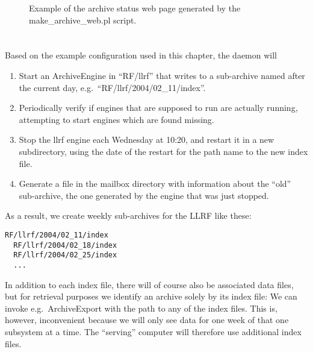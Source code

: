 \begin{figure}[htb]
\begin{center}
\end{center}
\caption{\label{fig:archcfgstat}Example of the archive status web page
  generated by the make\_archive\_web.pl script.}
\end{figure}

\section{}
Based on the example configuration used in this chapter,
the daemon will 
\begin{enumerate}
\item Start an ArchiveEngine in ``RF/llrf'' that writes to
      a sub-archive named after the current day,
      e.g.\ ``RF/llrf/2004/02\_11/index''.
\item Periodically verify if engines that are supposed to run are
      actually running, attempting to start engines which are found missing.
\item Stop the llrf engine each Wednesday at 10:20, and restart it in
      a new subdirectory, using the date of the restart for the path
      name to the new index file.
\item Generate a file in the mailbox directory with information about
      the ``old'' sub-archive, the one generated by the engine that was
      just stopped.
\end{enumerate}

\noindent As a result, we create weekly sub-archives for the LLRF like these:
\begin{lstlisting}[frame=none,keywordstyle=\sffamily]
  RF/llrf/2004/02_11/index
  RF/llrf/2004/02_18/index
  RF/llrf/2004/02_25/index
  ...
\end{lstlisting}
\noindent In addition to each index file, there will of course also be
associated data files, but for retrieval purposes we identify an
archive solely by its index file: We can invoke e.g.\ ArchiveExport
with the path to any of the index files. This is, however,
inconvenient because we will only see data for one week of that one
subsystem at a time.
The ``serving'' computer will therefore use additional index files.

